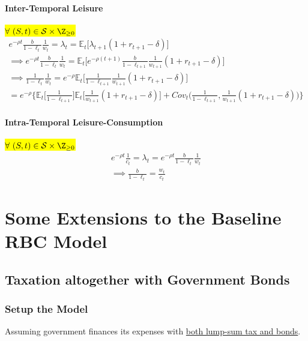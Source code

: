 \documentclass[11pt]{article}
\newcommand{\expat}[2]{\mathbb{E}_{#1}\Big[{#2}\Big]}
\begin{document}
				\paragraph{Inter-Temporal Leisure} \hl{$\forall \ (S, t) \in \mc{S} \times \Z_{\geq 0}$}
				\begin{gather}
					e^{-\rho t} \frac{b}{1-\ell_t} \frac{1}{w_t} = \lambda_t = \expat{t}{\lambda_{t+1} (1+r_{t+1}-\delta)} \\
					\implies e^{-\rho t} \frac{b}{1-\ell_t} \frac{1}{w_t} = \expat{t}{e^{-\rho(t+1)} \frac{b}{1-\ell_{t+1}} \frac{1}{w_{t+1}} (1+r_{t+1}-\delta)} \\
					\implies \frac{1}{1-\ell_t}\frac{1}{w_t} = e^{-\rho} \expat{t}{\frac{1}{1-\ell_{t+1}} \frac{1}{w_{t+1}} (1 + r_{t+1} - \delta)} \\
					= e^{-\rho}\Big \{
						\expat{t}{\frac{1}{1 - \ell_{t+1}}} \expat{t}{\frac{1}{w_{t+1}} (1 + r_{t+1} - \delta)} + Cov_t \Big(
								\frac{1}{1-\ell_{t+1}}, \frac{1}{w_{t+1}} (1 + r_{t+1} - \delta)
							\Big)
					\Big \}
				\end{gather}
				
				\paragraph{Intra-Temporal Leisure-Consumption} \hl{$\forall \ (S, t) \in \mc{S} \times \Z_{\geq 0}$}
					\begin{gather}
						e^{-\rho t} \frac{1}{c_t} = \lambda_t =  e^{-\rho t} \frac{b}{1 - \ell_t} \frac{1}{w_t} \\
						\implies \frac{b}{1-\ell_t} = \frac{w_t}{c_t}
					\end{gather}
	
	\section{Some Extensions to the Baseline RBC Model}
		\setcounter{equation}{0}
		\subsection{Taxation altogether with  Government Bonds}
			\subsubsection{Setup the Model}
			\begin{assumption}
				Assuming government finances its expenses with \ul{both lump-sum tax and bonds}.
			\end{assumption}
			
\end{document}
